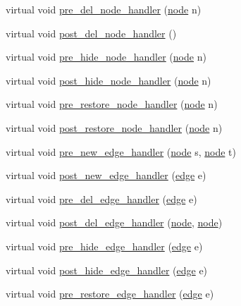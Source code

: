 \begin{DoxyCompactItemize}
virtual void \mbox{\hyperlink{classgraph_a06f8fe6d5ee6bef9066f78a0b95c083a}{pre\+\_\+del\+\_\+node\+\_\+handler}} (\mbox{\hyperlink{classnode}{node}} n)
\item 
virtual void \mbox{\hyperlink{classgraph_a4e08a559e3f1007a1a16a53c9a15cb0f}{post\+\_\+del\+\_\+node\+\_\+handler}} ()
\item 
virtual void \mbox{\hyperlink{classgraph_a96e6fadc8e77bde74448d4ba4b873628}{pre\+\_\+hide\+\_\+node\+\_\+handler}} (\mbox{\hyperlink{classnode}{node}} n)
\item 
virtual void \mbox{\hyperlink{classgraph_a89cd4d0acb9a82a85ba7845a92a68044}{post\+\_\+hide\+\_\+node\+\_\+handler}} (\mbox{\hyperlink{classnode}{node}} n)
\item 
virtual void \mbox{\hyperlink{classgraph_a7da481e2f363380343a68d52acc8473b}{pre\+\_\+restore\+\_\+node\+\_\+handler}} (\mbox{\hyperlink{classnode}{node}} n)
\item 
virtual void \mbox{\hyperlink{classgraph_ad0fd5fc9618111890b596601b6273713}{post\+\_\+restore\+\_\+node\+\_\+handler}} (\mbox{\hyperlink{classnode}{node}} n)
\item 
virtual void \mbox{\hyperlink{classgraph_ae57c6789ea5945e32fca200163e44d8b}{pre\+\_\+new\+\_\+edge\+\_\+handler}} (\mbox{\hyperlink{classnode}{node}} s, \mbox{\hyperlink{classnode}{node}} t)
\item 
virtual void \mbox{\hyperlink{classgraph_a88f098d412bcbacba975e70be8d1a892}{post\+\_\+new\+\_\+edge\+\_\+handler}} (\mbox{\hyperlink{classedge}{edge}} e)
\item 
virtual void \mbox{\hyperlink{classgraph_a413590984a00770927ba619c409a7b57}{pre\+\_\+del\+\_\+edge\+\_\+handler}} (\mbox{\hyperlink{classedge}{edge}} e)
\item 
virtual void \mbox{\hyperlink{classgraph_ab9ac8bcc7288986de69cd467beb33600}{post\+\_\+del\+\_\+edge\+\_\+handler}} (\mbox{\hyperlink{classnode}{node}}, \mbox{\hyperlink{classnode}{node}})
\item 
virtual void \mbox{\hyperlink{classgraph_ad755188a78a38f733cf362d4e8dd47f8}{pre\+\_\+hide\+\_\+edge\+\_\+handler}} (\mbox{\hyperlink{classedge}{edge}} e)
\item 
virtual void \mbox{\hyperlink{classgraph_a7554deb5a22be446b2b423f2ce481c64}{post\+\_\+hide\+\_\+edge\+\_\+handler}} (\mbox{\hyperlink{classedge}{edge}} e)
\item 
virtual void \mbox{\hyperlink{classgraph_a4c3634093c7d8877b6c229bcbfa4702b}{pre\+\_\+restore\+\_\+edge\+\_\+handler}} (\mbox{\hyperlink{classedge}{edge}} e)

\end{DoxyCompactItemize}
